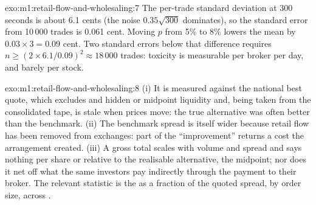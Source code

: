 \begin{solution}{exo:m1:retail-flow-and-wholesaling:7}
The per-trade standard deviation at 300 seconds is about 6.1 cents (the
noise $0.35\sqrt{300}$ dominates), so the standard error from 10\,000 trades
is 0.061 cent. Moving $p$ from 5\% to 8\% lowers the mean by $0.03 \times 3 =
0.09$ cent. Two standard errors below that difference requires $n \ge
(2\times6.1/0.09)^2 \approx 18\,000$ trades: toxicity is measurable per
broker per day, and barely per stock.
\end{solution}

\begin{solution}{exo:m1:retail-flow-and-wholesaling:8}
(i) It is measured against the national best quote, which excludes 
and hidden or midpoint liquidity and, being taken from the consolidated tape,
is stale when prices move: the true alternative was often better than the
benchmark. (ii) The benchmark spread is itself wider because retail flow has
been removed from exchanges: part of the ``improvement'' returns a cost the
arrangement created. (iii) A gross total scales with volume and spread and
says nothing per share or relative to the realisable alternative, the
midpoint; nor does it net off what the same investors pay indirectly through
the payment to their broker. The relevant statistic is the 
as a fraction of the quoted spread, by order size, across .
\end{solution}


